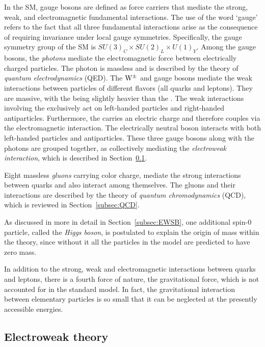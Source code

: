 In the SM, gauge bosons are defined as force carriers that mediate the strong, weak, and electromagnetic fundamental interactions.
The use of the word `gauge' refers to the fact that all three fundamental interactions arise as the consequence of requiring invariance under local gauge symmetries. 
Specifically, the gauge symmetry group of the SM is $SU(3)_C \times SU(2)_L \times U(1)_Y$.
Among the gauge bosons, the \textit{photons} mediate the electromagnetic force between electrically charged particles.
The photon is massless and is described by the theory of \textit{quantum electrodynamics} (QED).
The $\mathrm{W}^{\pm}$ and \PZ gauge bosons mediate the weak interactions between particles of different flavors (all quarks and leptons).
They are massive, with the \PZ being slightly heavier than the \PW.
The weak interactions involving the \PW exclusively act on left-handed particles and right-handed antiparticles.
Furthermore, the \PW carries an electric charge and therefore couples via the electromagnetic interaction.
The electrically neutral \PZ boson interacts with both left-handed particles and antiparticles.
These three gauge bosons along with the photons are grouped together, as collectively mediating the \textit{electroweak interaction}, which is described in Section~\ref{subsec:EWtheory}.

Eight massless \textit{gluons} carrying color charge, mediate the strong interactions between quarks and also interact among themselves.
The gluons and their interactions are described by the theory of \textit{quantum chromodynamics} (QCD), which is reviewed in Section~\ref{subsec:QCD}.

As discussed in more in detail in Section~\ref{subsec:EWSB}, one additional spin-0 particle, called the \textit{Higgs boson}, is postulated to explain the origin of mass within the theory,
since without it all the particles in the model are predicted to have zero mass.

In addition to the strong, weak and electromagnetic interactions between quarks and leptons, there is a fourth force of nature, the gravitational force, which is not accounted for in the standard model.
In fact, the gravitational interaction between elementary particles is so small that it can be neglected at the presently accessible energies.

\subsection{Electroweak theory}\label{subsec:EWtheory}

